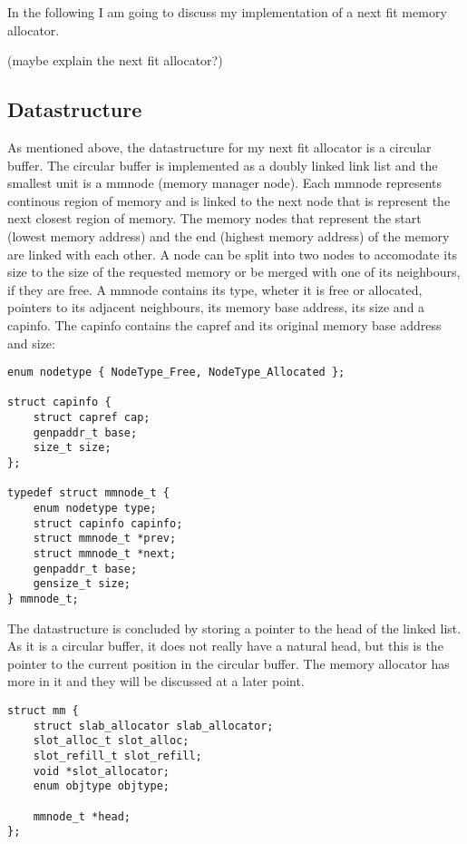 In the following I am going to discuss my implementation of a next fit memory
allocator.

(maybe explain the next fit allocator?)

\subsection{Datastructure}

As mentioned above, the datastructure for my next fit allocator is a circular
buffer.  The circular buffer is implemented as a doubly linked link list and the
smallest unit is a mmnode (memory manager node).  Each mmnode represents
continous region of memory and is linked to the next node that is represent the
next closest region of memory. The memory nodes that represent the start (lowest
memory address) and the end (highest memory address) of the memory are linked
with each other.  A node can be split into two nodes to accomodate its size to
the size of the requested memory or be merged with one of its neighbours, if
they are free.  A mmnode contains its type, wheter it is free or allocated,
pointers to its adjacent neighbours, its memory base address, its size and a
capinfo. The capinfo contains the capref and its original memory base address
and size:

\begin{verbatim}
enum nodetype { NodeType_Free, NodeType_Allocated };

struct capinfo {
    struct capref cap;
    genpaddr_t base;
    size_t size;
};

typedef struct mmnode_t {
    enum nodetype type;
    struct capinfo capinfo;
    struct mmnode_t *prev;
    struct mmnode_t *next;
    genpaddr_t base;
    gensize_t size;
} mmnode_t;
\end{verbatim}

The datastructure is concluded by storing a pointer to the head of the linked
list. As it is a circular buffer, it does not really have a natural head, but
this is the pointer to the current position in the circular buffer. The memory
allocator has more in it and they will be discussed at a later point.

\begin{verbatim}
struct mm {
    struct slab_allocator slab_allocator;
    slot_alloc_t slot_alloc;
    slot_refill_t slot_refill;
    void *slot_allocator;
    enum objtype objtype;

    mmnode_t *head;
};
\end{verbatim}

